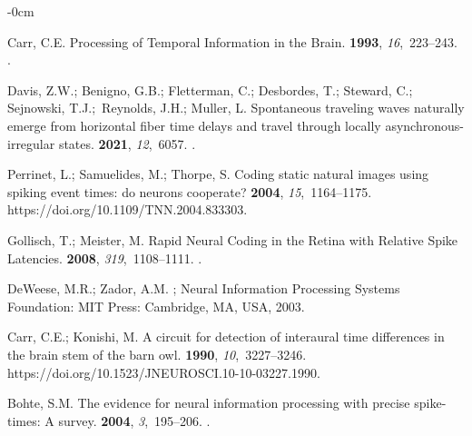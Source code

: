 \documentclass[brainsci, %
               review,accept,pdftex,moreauthors
               ]{Definitions/mdpi}
\begin{document}
\begin{adjustwidth}{-\extralength}{0cm}
\begin{thebibliography}{999}
Carr, C.E.
\newblock Processing of {Temporal} {Information} in the {Brain}.
 {\bf 1993}, {\em 16},~223--243.\linebreak
{}.

Davis, Z.W.; Benigno, G.B.; Fletterman, C.; Desbordes, T.; Steward, C.;
  Sejnowski, T.J.;~Reynolds, J.H.; Muller, L.
\newblock Spontaneous traveling waves naturally emerge from horizontal fiber
  time delays and travel through locally asynchronous-irregular states.
 {\bf 2021}, {\em 12},~6057.
.

Perrinet, L.; Samuelides, M.; Thorpe, S.
\newblock Coding static natural images using spiking event times: do neurons
  cooperate?
 {\bf 2004}, {\em
  15},~1164--1175.
 {{https://doi.org/10.1109/TNN.2004.833303}}.

Gollisch, T.; Meister, M.
\newblock Rapid {Neural} {Coding} in the {Retina} with {Relative} {Spike}
  {Latencies}.
 {\bf 2008}, {\em 319},~1108--1111.
.

DeWeese, M.R.; Zador, A.M.
; {Neural Information Processing
  Systems Foundation:} 
  \newblock MIT Press: Cambridge, MA, USA,
   2003.

Carr, C.E.; Konishi, M.
\newblock A circuit for detection of interaural time differences in the brain
  stem of the barn owl.
 {\bf 1990}, {\em 10},~3227--3246.
  {{https://doi.org/10.1523/JNEUROSCI.10-10-03227.1990}}.

Bohte, S.M.
\newblock The evidence for neural information processing with precise
  spike-times: {A} survey.
 {\bf 2004}, {\em 3},~195--206.
.


\end{thebibliography}
\end{adjustwidth}
\end{document}
